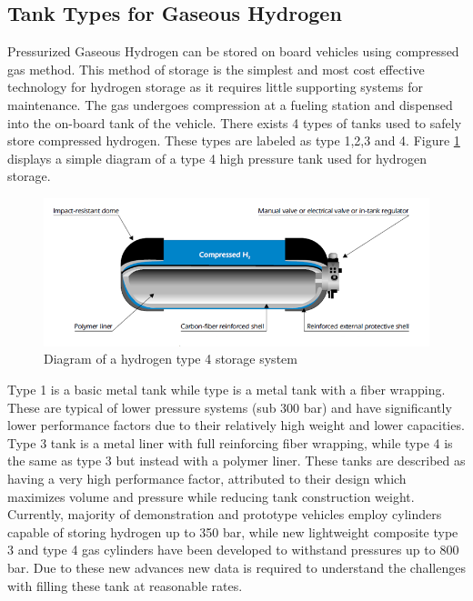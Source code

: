 \documentclass[paper=a4, fontsize=11pt, abstract=on]{scrartcl}
\numberwithin{equation}{section}		%
\numberwithin{figure}{section}			%
\numberwithin{table}{section}				%
\begin{document}
\subsection{Tank Types for Gaseous Hydrogen}
Pressurized Gaseous Hydrogen can be stored on board vehicles using compressed gas method. This method of storage is the simplest and most cost effective technology for hydrogen storage as it requires little supporting systems for maintenance. The gas undergoes compression at a fueling station and dispensed into the on-board tank of the vehicle. There exists 4 types of tanks used to safely store compressed hydrogen. These types are labeled as type 1,2,3 and 4. Figure \ref{tank} displays a simple diagram of a type 4 high pressure tank used for hydrogen storage.


\begin{figure}[H]
\centering
\includegraphics[width=0.8\linewidth]{tank2}
\caption{Diagram of a hydrogen type 4 storage system}
\label{tank}
\end{figure}

 Type 1 is a basic metal tank while type is a metal tank with a fiber wrapping. These are typical of lower pressure systems (sub 300 bar) and have significantly lower performance factors due to their relatively high weight and lower capacities. Type 3 tank is a metal liner with full reinforcing fiber wrapping, while type 4 is the same as type 3 but instead with a polymer liner. These tanks are described as having a very high performance factor, attributed to their design which maximizes volume and pressure while reducing tank construction weight.  Currently, majority of demonstration and prototype vehicles employ cylinders capable of storing hydrogen up to 350 bar, while new lightweight composite type 3 and type 4 gas cylinders have been developed to withstand pressures up to 800 bar. Due to these new advances new data is required to understand the challenges with filling these tank at reasonable rates.
\end{document}
